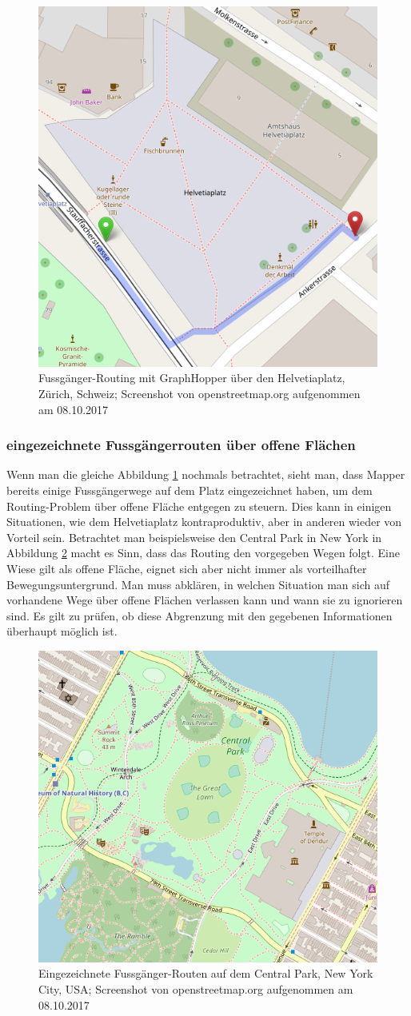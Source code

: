 \begin{figure}[ht]
	\centering
	\includegraphics[width=0.5\linewidth]{technicalreport/img/helvetiaplatz_graphhopper}
	\caption[Fussgänger-Routing]{Fussgänger-Routing mit GraphHopper über den Helvetiaplatz, Zürich, Schweiz; Screenshot von openstreetmap.org aufgenommen am 08.10.2017}
	\label{fig:helvetiaplatz_graphhopper}
\end{figure}

\subsubsection{eingezeichnete Fussgängerrouten über offene Flächen}
\label{problem:eingezeichnete Fussgängerrouten über offene Flächen}
Wenn man die gleiche Abbildung \ref{fig:helvetiaplatz_graphhopper} nochmals betrachtet, sieht man, dass Mapper bereits einige Fussgängerwege auf dem Platz eingezeichnet haben, um dem Routing-Problem über offene Fläche entgegen zu steuern. Dies kann in einigen Situationen, wie dem Helvetiaplatz kontraproduktiv, aber in anderen wieder von Vorteil sein. Betrachtet man beispielsweise den Central Park in New York in Abbildung \ref{fig:central_park} macht es Sinn, dass das Routing den vorgegeben Wegen folgt. Eine Wiese gilt als offene Fläche, eignet sich aber nicht immer als vorteilhafter Bewegungsuntergrund. Man muss abklären, in welchen Situation man sich auf vorhandene Wege über offene Flächen verlassen kann und wann sie zu ignorieren sind. Es gilt zu prüfen, ob diese Abgrenzung mit den gegebenen Informationen überhaupt möglich ist.

\begin{figure}[ht]
\centering
\includegraphics[width=0.5\linewidth]{technicalreport/img/central_park}
\caption[eingezeichnete Fussgänger-Routen]{Eingezeichnete Fussgänger-Routen auf dem Central Park, New York City, USA; Screenshot von openstreetmap.org aufgenommen am 08.10.2017}
\label{fig:central_park}
\end{figure}

